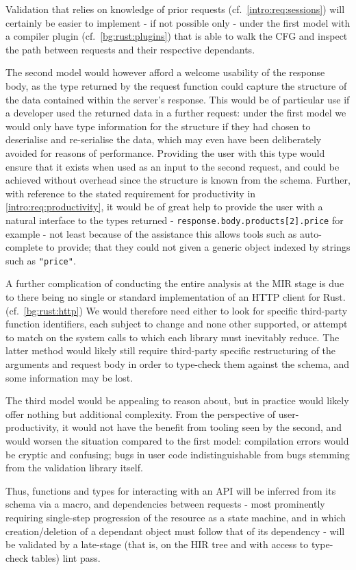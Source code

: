 Validation that relies on knowledge of prior requests (cf.~\cref{intro:req:sessions}) will certainly be easier to implement - if not possible only - under the first model with a compiler plugin (cf.~\cref{bg:rust:plugins}) that is able to walk the CFG and inspect the path between requests and their respective dependants.

The second model would however afford a welcome usability of the response body, as the type returned by the request function could capture the structure of the data contained within the server's response. This would be of particular use if a developer used the returned data in a further request: under the first model we would only have type information for the structure if they had chosen to deserialise and re-serialise the data, which may even have been deliberately avoided  for reasons of performance. Providing the user with this type would ensure that it exists when used as an input to the second request, and could be achieved without overhead since the structure is known from the schema. Further, with reference to the stated requirement for productivity in \cref{intro:req:productivity}, it would be of great help to provide the user with a natural interface to the types returned - \texttt{response.body.products[2].price} for example - not least because of the assistance this allows tools such as auto-complete to provide; that they could not given a generic object indexed by strings such as \texttt{"price"}.

A further complication of conducting the entire analysis at the MIR stage is due to there being no single or standard implementation of an HTTP client for Rust. (cf.~\cref{bg:rust:http}) We would therefore need either to look for specific third-party function identifiers, each subject to change and none other supported, or attempt to match on the system calls to which each library must inevitably reduce. The latter method would likely still require third-party specific restructuring of the arguments and request body in order to type-check them against the schema, and some information may be lost.

The third model would be appealing to reason about, but in practice would likely offer nothing but additional complexity. From the perspective of user-productivity, it would not have the benefit from tooling seen by the second, and would worsen the situation compared to the first model: compilation errors would be cryptic and confusing; bugs in user code indistinguishable from bugs stemming from the validation library itself.

Thus, functions and types for interacting with an API will be inferred from its schema via a macro, and dependencies between requests - most prominently  requiring single-step progression of the resource as a state machine, and  in which creation/deletion of a dependant object must follow that of its dependency - will be validated by a late-stage (that is, on the HIR tree and with access to type-check tables) lint pass.  \label{impl:proposal:validation}